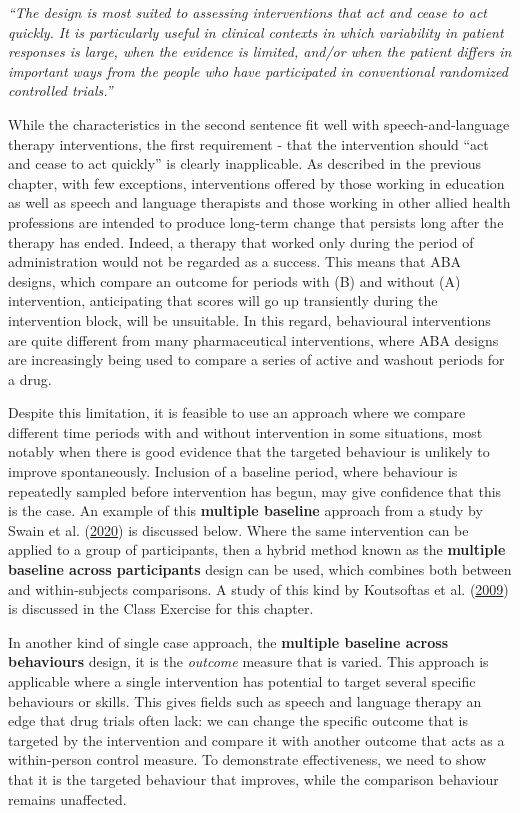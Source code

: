 \documentclass{krantz}
\begin{document}
\emph{``The design is most suited to assessing interventions that act and cease to act quickly. It is particularly useful in clinical contexts in which variability in patient responses is large, when the evidence is limited, and/or when the patient differs in important ways from the people who have participated in conventional randomized controlled trials.''}

While the characteristics in the second sentence fit well with speech-and-language therapy interventions, the first requirement - that the intervention should ``act and cease to act quickly'' is clearly inapplicable. As described in the previous chapter, with few exceptions, interventions offered by those working in education as well as speech and language therapists and those working in other allied health professions are intended to produce long-term change that persists long after the therapy has ended. Indeed, a therapy that worked only during the period of administration would not be regarded as a success. This means that ABA designs, which compare an outcome for periods with (B) and without (A) intervention, anticipating that scores will go up transiently during the intervention block, will be unsuitable. In this regard, behavioural interventions are quite different from many pharmaceutical interventions, where ABA designs are increasingly being used to compare a series of active and washout periods for a drug.

Despite this limitation, it is feasible to use an approach where we compare different time periods with and without intervention in some situations, most notably when there is good evidence that the targeted behaviour is unlikely to improve spontaneously. Inclusion of a baseline period, where behaviour is repeatedly sampled before intervention has begun, may give confidence that this is the case. An example of this \textbf{multiple baseline} approach from a study by Swain et al. (\protect\hyperlink{ref-swain2020}{2020}) is discussed below. Where the same intervention can be applied to a group of participants, then a hybrid method known as the \textbf{multiple baseline across participants} design can be used, which combines both between and within-subjects comparisons. A study of this kind by Koutsoftas et al. (\protect\hyperlink{ref-koutsoftas2009}{2009}) is discussed in the Class Exercise for this chapter.

In another kind of single case approach, the \textbf{multiple baseline across behaviours} design, it is the \emph{outcome} measure that is varied. This approach is applicable where a single intervention has potential to target several specific behaviours or skills. This gives fields such as speech and language therapy an edge that drug trials often lack: we can change the specific outcome that is targeted by the intervention and compare it with another outcome that acts as a within-person control measure. To demonstrate effectiveness, we need to show that it is the targeted behaviour that improves, while the comparison behaviour remains unaffected.
\end{document}
